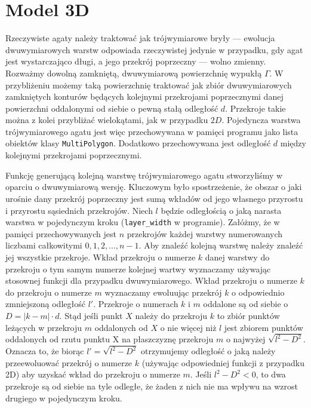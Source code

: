 \documentclass{article}
\begin{document}
\section{Model 3D}
Rzeczywiste agaty należy traktować jak trójwymiarowe bryły --- ewolucja dwuwymiarowych warstw odpowiada rzeczywistej jedynie w przypadku, gdy agat jest wystarczająco długi, a jego przekrój poprzeczny --- wolno zmienny. Rozważmy dowolną zamkniętą, dwuwymiarową powierzchnię wypukłą $\Gamma$. W przybliżeniu możemy taką powierzchnię traktować jak zbiór dwuwymiarowych zamkniętych konturów będących kolejnymi przekrojami poprzecznymi danej powierzchni oddalonymi od siebie o pewną stałą odległość $d$. Przekroje takie można z kolei przybliżać wielokątami, jak w przypadku $2D$. Pojedyncza warstwa trójwymiarowego agatu jest więc przechowywana w pamięci programu jako lista obiektów klasy \texttt{MultiPolygon}. Dodatkowo przechowywana jest odległość $d$ między kolejnymi przekrojami poprzecznymi.

Funkcję generującą kolejną warstwę trójwymiarowego agatu stworzyliśmy w oparciu o dwuwymiarową wersję. Kluczowym było spostrzeżenie, że obszar o jaki urośnie dany przekrój poprzeczny jest sumą wkładów od jego własnego przyrostu i przyrostu sąsiednich przekrojów. Niech $l$ będzie odległością o jaką narasta warstwa w pojedynczym kroku (\texttt{layer\_width} w programie). Załóżmy, że w pamięci przechowywanych jest $n$ przekrojów każdej warstwy numerowanych liczbami całkowitymi $0,1,2,...,n-1$. Aby znaleźć kolejną warstwę należy znaleźć jej wszystkie przekroje. Wkład przekroju o numerze $k$ danej warstwy do przekroju o tym samym numerze kolejnej wartwy wyznaczamy używając stosownej funkcji dla przypadku dwuwymiarowego. Wkład przekroju o numerze $k$ do przekroju o numerze $m$ wyznaczamy ewoluując przekrój $k$ o odpowiednio zmniejszoną odległość $l'$. Przekroje o numerach $k$ i $m$ oddalone są od siebie o $D=|k-m| \cdot d$. Stąd jeśli punkt $X$ należy do przekroju $k$ to zbiór punktów leżących w przekroju $m$ oddalonych od $X$ o nie więcej niż $l$ jest zbiorem punktów oddalonych od rzutu punktu X na płaszczyznę przekroju $m$ o najwyżej $\sqrt{l^2-D^2}$. Oznacza to, że biorąc $l'=\sqrt{l^2-D^2}$ otrzymujemy odległość o jaką należy przeewoluować przekrój o numerze $k$ (używając odpowiedniej funkcji z przypadku 2D) aby uzyskać wkład do przekroju o numerze $m$. Jeśli $l^2-D^2<0$, to dwa przekroje są od siebie na tyle odległe, że żaden z nich nie ma wpływu na wzrost drugiego w pojedynczym kroku.
\end{document}
